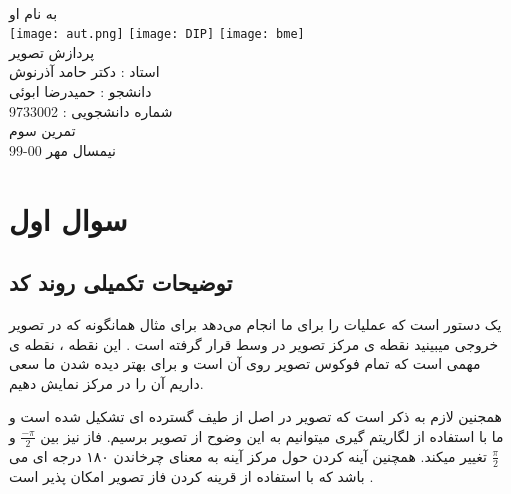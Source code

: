 \documentclass[12pt]{article}
\begin{document}
	\doublespacing
	\begin{titlepage}
		\paragraph*{}
		\centering
			
			
			{\small به نام او}\\
			\vspace{1cm}
			\texttt{[image: aut.png]}
			\hspace{1cm}
			\texttt{[image: DIP]}
			\hspace{1cm}
			\texttt{[image: bme]}\\
			\vspace{2cm}
			{\Huge پردازش تصویر}\\
			\vspace{2cm}
			{\large استاد : دکتر حامد آذرنوش}\\
			\vspace{0.5cm}
			{\small  دانشجو :‌ حمیدرضا ابوئی}\\
			\vspace{0.5cm}
			{\small شماره دانشجویی : 9733002}\\
			\vspace{0.5cm}
			{\small تمرین سوم}\\
			\vfill
			{\tiny نیمسال مهر 00-99}
	\end{titlepage}
	\thispagestyle{plain}
	\tableofcontents
	\newpage
	\doublespacing
	\section{سوال اول}
		\subsection{توضیحات تکمیلی روند کد}
		یک دستور است که عملیات 
		را برای ما انجام می‌دهد برای مثال همانگونه که در تصویر خروجی میبینید نقطه ی مرکز تصویر در وسط قرار گرفته است . این نقطه ، نقطه ی مهمی است که تمام فوکوس تصویر روی آن است و برای بهتر دیده شدن ما سعی داریم آن را در مرکز نمایش دهیم.
		 
		 همجنین لازم به ذکر است که تصویر 
		 در اصل از طیف گسترده ای تشکیل شده است و ما با استفاده از لگاریتم گیری میتوانیم به این وضوح از تصویر برسیم.
		 فاز نیز بین 
		 $\frac{-\pi}{2}$
		 و 
		 $\frac{\pi}{2}$
		 تغییر میکند.
		 همچنین آینه کردن حول مرکز آینه به معنای چرخاندن ۱۸۰ درجه ای می باشد که با استفاده از قرینه کردن فاز تصویر امکان پذیر است .
		
\end{document}
